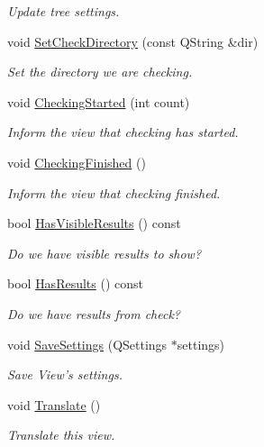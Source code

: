 \begin{DoxyCompactItemize}
\begin{DoxyCompactList}\small\item\em Update tree settings. \end{DoxyCompactList}\item 
void \hyperlink{class_results_view_af53a1c22bc91f599caac36a7cedc03c9}{Set\-Check\-Directory} (const Q\-String \&dir)
\begin{DoxyCompactList}\small\item\em Set the directory we are checking. \end{DoxyCompactList}\item 
void \hyperlink{class_results_view_aa06e2aea2f5a97cd0ae1a9be4035b7c1}{Checking\-Started} (int count)
\begin{DoxyCompactList}\small\item\em Inform the view that checking has started. \end{DoxyCompactList}\item 
void \hyperlink{class_results_view_a1b1c6e3a6d14640201617ae0f8a82bd3}{Checking\-Finished} ()
\begin{DoxyCompactList}\small\item\em Inform the view that checking finished. \end{DoxyCompactList}\item 
bool \hyperlink{class_results_view_ad433507e2d387b2e3b9d23df9d288e5e}{Has\-Visible\-Results} () const 
\begin{DoxyCompactList}\small\item\em Do we have visible results to show? \end{DoxyCompactList}\item 
bool \hyperlink{class_results_view_a819b5d859e6f4e372fc2ffdbe001861c}{Has\-Results} () const 
\begin{DoxyCompactList}\small\item\em Do we have results from check? \end{DoxyCompactList}\item 
void \hyperlink{class_results_view_aa32b8312612f137e50a292d60919017c}{Save\-Settings} (Q\-Settings $\ast$settings)
\begin{DoxyCompactList}\small\item\em Save View's settings. \end{DoxyCompactList}\item 
void \hyperlink{class_results_view_ab4c1e0ca655a011941778dd2a53d8c0f}{Translate} ()
\begin{DoxyCompactList}\small\item\em Translate this view. \end{DoxyCompactList}\item 

\end{DoxyCompactItemize}
